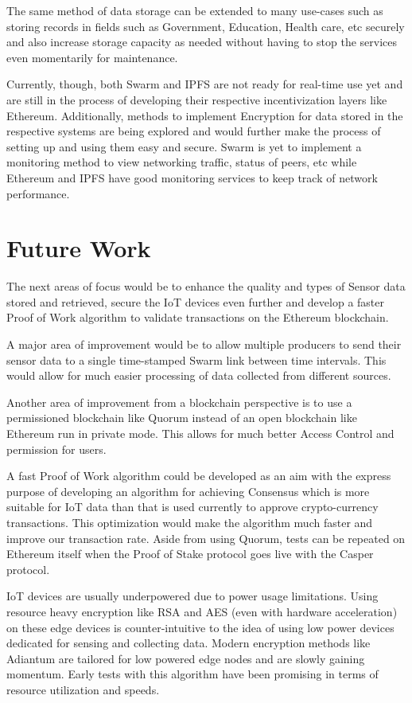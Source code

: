 \documentclass[11pt,openright]{report}
\begin{document}
The same method of data storage can be extended to many use-cases such as storing records in fields such as Government, Education, Health care, etc securely and also increase storage capacity as needed without having to stop the services even momentarily for maintenance.

Currently, though, both Swarm and IPFS are not ready for real-time use yet and are still in the process of developing their respective incentivization layers \cite{ethersphere2016sw3} like Ethereum. Additionally, methods to implement Encryption for data stored in the respective systems are being explored and would further make the process of setting up and using them easy and secure. Swarm is yet to implement a monitoring method to view networking traffic, status of peers, etc while Ethereum and IPFS have good monitoring services to keep track of network performance.

\section{Future Work}
The next areas of focus would be to enhance the quality and types of Sensor data stored and retrieved, secure the IoT devices even further and develop a faster Proof of Work algorithm to validate transactions on the Ethereum blockchain. 

A major area of improvement would be to allow multiple producers to send their sensor data to a single time-stamped Swarm link between time intervals. This would allow for much easier processing of data collected from different sources.

Another area of improvement from a blockchain perspective is to use a permissioned blockchain like Quorum\cite{quorum} instead of an open blockchain like Ethereum run in private mode. This allows for much better Access Control and permission for users.

A fast Proof of Work algorithm could be developed as an aim with the express purpose of developing an algorithm for achieving Consensus which is more suitable for IoT data than that is used currently to approve crypto-currency transactions. This optimization would make the algorithm much faster and improve our transaction rate. Aside from using Quorum, tests can be repeated on Ethereum itself when the Proof of Stake protocol goes live with the Casper protocol.

IoT devices are usually underpowered due to power usage limitations. Using resource heavy encryption like RSA and AES (even with hardware acceleration) on these edge devices is counter-intuitive to the idea of using low power devices dedicated for sensing and collecting data. Modern encryption methods like Adiantum \cite{DBLP:journals/tosc/CrowleyB18} are tailored for low powered edge nodes and are slowly gaining momentum. Early tests with this algorithm have been promising in terms of resource utilization and speeds.
\end{document}
